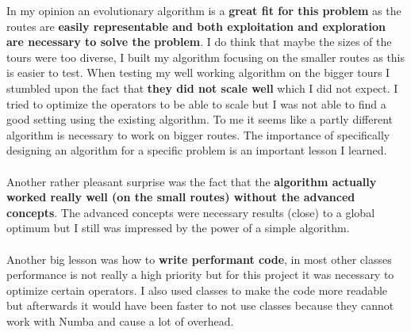 \documentclass[a4paper,10pt]{article}
\begin{document}
In my opinion an evolutionary algorithm is a \textbf{great fit for this problem} as the routes are \textbf{easily representable and both exploitation and exploration are necessary to solve the problem}. I do think that maybe the sizes of the tours were too diverse, I built my algorithm focusing on the smaller routes as this is easier to test. When testing my well working algorithm on the bigger tours I stumbled upon the fact that \textbf{they did not scale well} which I did not expect. I tried to optimize the operators to be able to scale but I was not able to find a good setting using the existing algorithm. To me it seems like a partly different algorithm is necessary to work on bigger routes. The importance of specifically designing an algorithm for a specific problem is an important lesson I learned.
\\\\
Another rather pleasant surprise was the fact that the \textbf{algorithm actually worked really well (on the small routes) without the advanced concepts}. The advanced concepts were necessary results (close) to a global optimum but I still was impressed by the power of a simple algorithm.
\\\\
Another big lesson was how to \textbf{write performant code}, in most other classes performance is not really a high priority but for this project it was necessary to optimize certain operators. I also used classes to make the code more readable but afterwards it would have been faster to not use classes because they cannot work with Numba and cause a lot of overhead.
\end{document}
